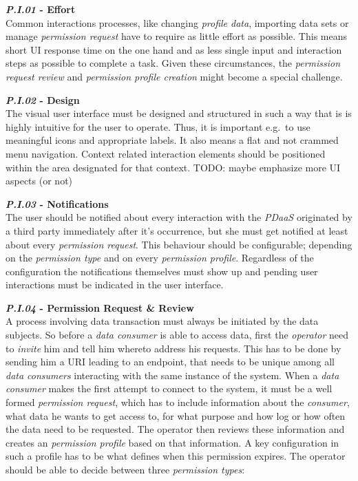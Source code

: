 \documentclass[12pt,english,a4paper,titlepage,cleardoublepage=empty,dottedtoc]{report}
\begin{document}
\textbf{\emph{\protect\hypertarget{pi01}{}{P.I.01}} - Effort}\\
Common interactions processes, like changing \emph{profile data},
importing data sets or manage \emph{permission request} have to require
as little effort as possible. This means short UI response time on the
one hand and as less single input and interaction steps as possible to
complete a task. Given these circumstances, the \emph{permission request
review} and \emph{permission profile creation} might become a special
challenge.

\textbf{\emph{\protect\hypertarget{pi02}{}{P.I.02}} - Design}\\
The visual user interface must be designed and structured in such a way
that is is highly intuitive for the user to operate. Thus, it is
important e.g.~to use meaningful icons and appropriate labels. It also
means a flat and not crammed menu navigation. Context related
interaction elements should be positioned within the area designated for
that context. TODO: maybe emphasize more UI aspects (or not)

\textbf{\emph{\protect\hypertarget{pi03}{}{P.I.03}} - Notifications}\\
The user should be notified about every interaction with the
\emph{PDaaS} originated by a third party immediately after it's
occurrence, but she must get notified at least about every
\emph{permission request}. This behaviour should be configurable;
depending on the \emph{permission type} and on every \emph{permission
profile}. Regardless of the configuration the notifications themselves
must show up and pending user interactions must be indicated in the user
interface.

\textbf{\emph{\protect\hypertarget{pi04}{}{P.I.04}} - Permission Request
\& Review}\\
A process involving data transaction must always be initiated by the
data subjects. So before a \emph{data consumer} is able to access data,
first the \emph{operator} need to \emph{invite} him and tell him whereto
address his requests. This has to be done by sending him a URI leading
to an endpoint, that needs to be unique among all \emph{data consumers}
interacting with the same instance of the system. When a \emph{data
consumer} makes the first attempt to connect to the system, it must be a
well formed \emph{permission request}, which has to include information
about the \emph{consumer}, what data he wants to get access to, for what
purpose and how log or how often the data need to be requested. The
operator then reviews these information and creates an \emph{permission
profile} based on that information. A key configuration in such a
profile has to be what defines when this permission expires. The
operator should be able to decide between three \emph{permission types}:
\end{document}

